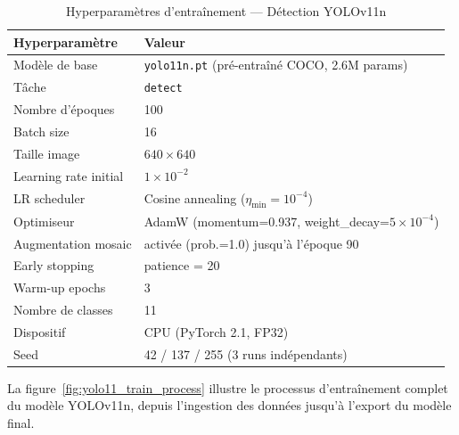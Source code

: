 \begin{table}[H]
\centering
\caption{Hyperparamètres d'entraînement --- Détection YOLOv11n}
\label{tab:yolo11_hp_det}
\begin{tabular}{ll}
\toprule
\textbf{Hyperparamètre} & \textbf{Valeur} \\
\midrule
Modèle de base          & \texttt{yolo11n.pt} (pré-entraîné COCO, 2.6M params) \\
Tâche                   & \texttt{detect} \\
Nombre d'époques        & 100 \\
Batch size              & 16 \\
Taille image            & $640 \times 640$ \\
Learning rate initial   & $1\times10^{-2}$ \\
LR scheduler            & Cosine annealing ($\eta_\text{min} = 10^{-4}$) \\
Optimiseur              & AdamW (momentum=0.937, weight\_decay=$5\times10^{-4}$) \\
Augmentation mosaic     & activée (prob.=1.0) jusqu'à l'époque 90 \\
Early stopping          & patience = 20 \\
Warm-up epochs          & 3 \\
Nombre de classes       & 11 \\
Dispositif              & CPU (PyTorch 2.1, FP32) \\
Seed                    & 42 / 137 / 255 (3 runs indépendants) \\
\bottomrule
\end{tabular}
\end{table}

La figure~\ref{fig:yolo11_train_process} illustre le processus d'entraînement
complet du modèle YOLOv11n, depuis l'ingestion des données jusqu'à l'export
du modèle final.


